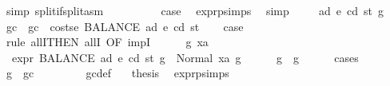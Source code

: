 \begin{isabellebody}
\ {\isacharparenleft}{\kern0pt}simp\ split{\isacharcolon}{\kern0pt}if{\isacharunderscore}{\kern0pt}split{\isacharunderscore}{\kern0pt}asm{\isacharparenright}{\kern0pt}\isanewline
{}\isamarkupfalse%
\isanewline
\ \ \isamarkupfalse%
\ {}{}\isanewline
\ \ \isamarkupfalse%
\ \isamarkupfalse%
\ {\isacharquery}{\kern0pt}case\ \isamarkupfalse%
\ expr{\isachardot}{\kern0pt}psimps{\isacharparenleft}{\kern0pt}{}{\isacharparenright}{\kern0pt}\ \isamarkupfalse%
\ simp\isanewline
{}\isamarkupfalse%
\isanewline
\ \ \isamarkupfalse%
\ {\isacharparenleft}{\kern0pt}{}{}\ ad\ e\ cd\ st\ g{\isacharparenright}{\kern0pt}\isanewline
\ \ \isamarkupfalse%
\ gc\ \ {\isachardoublequoteopen}gc\ {\isacharequal}{\kern0pt}\ costs\isactrlsub e\ {\isacharparenleft}{\kern0pt}BALANCE\ ad{\isacharparenright}{\kern0pt}\ e\ cd\ st{\isachardoublequoteclose}\isanewline
\ \ \isamarkupfalse%
\ {\isacharquery}{\kern0pt}case\isanewline
\ \ \isamarkupfalse%
\ {\isacharparenleft}{\kern0pt}rule\ allI{\isacharbrackleft}{\kern0pt}THEN\ allI{\isacharcomma}{\kern0pt}\ OF\ impI{\isacharbrackright}{\kern0pt}{\isacharparenright}{\kern0pt}\isanewline
\ \ \ \ \isamarkupfalse%
\ g{}\ xa\isanewline
\ \ \ \ \isamarkupfalse%
\ {\isacharasterisk}{\kern0pt}{\isacharcolon}{\kern0pt}\ {\isachardoublequoteopen}expr\ {\isacharparenleft}{\kern0pt}BALANCE\ ad{\isacharparenright}{\kern0pt}\ e\ cd\ st\ g\ {\isacharequal}{\kern0pt}\ Normal\ {\isacharparenleft}{\kern0pt}xa{\isacharcomma}{\kern0pt}\ g{}{\isacharparenright}{\kern0pt}{\isachardoublequoteclose}\isanewline
\ \ \ \ \isamarkupfalse%
\ {\isachardoublequoteopen}g{}\ {\isasymle}\ g{\isachardoublequoteclose}\isanewline
\ \ \ \ \isamarkupfalse%
\ {\isacharparenleft}{\kern0pt}cases{\isacharparenright}{\kern0pt}\isanewline
\ \ \ \ \ \ \isamarkupfalse%
\ {\isachardoublequoteopen}g\ {\isasymle}\ gc{\isachardoublequoteclose}\isanewline
\ \ \ \ \ \ \isamarkupfalse%
\ {}{}\ gc{\isacharunderscore}{\kern0pt}def\ {\isacharasterisk}{\kern0pt}\ \isamarkupfalse%
\ {\isacharquery}{\kern0pt}thesis\ \isamarkupfalse%
\ expr{\isachardot}{\kern0pt}psimps{\isacharparenleft}{\kern0pt}{}{\isacharparenright}{\kern0pt}\ \isamarkupfalse%

\end{isabellebody}
